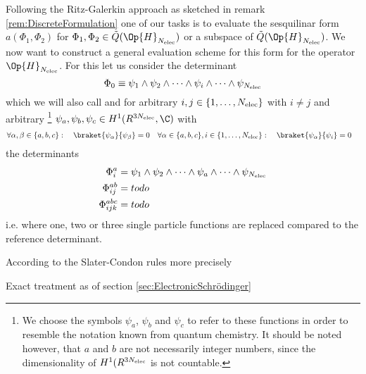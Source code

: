 Following the Ritz-Galerkin approach
as sketched in remark \vref{rem:DiscreteFormulation}
one of our tasks is to evaluate the sesquilinar form
$a(\Phi_1, \Phi_2)$ for $\Phi_1, \Phi_2 \in \tilde{Q}(\Op{H}_{\Nelec})$ or a subspace of $\tilde{Q}(\Op{H}_{\Nelec})$.
We now want to construct a general evaluation scheme
for this form for the operator $\Op{H}_{\Nelec}$.
For this let us consider the determinant
\[
	\Phi_0 \equiv \psi_1 \wedge \psi_2 \wedge \cdots \wedge \psi_i \wedge \cdots \wedge \psi_{N_\text{elec}}
\]
which we will also call 
and for arbitrary $i,j \in \{1,\ldots,N_\text{elec}\}$
with $i \neq j$
and arbitrary%
\footnote{We choose the symbols $\psi_a$, $\psi_b$ and $\psi_c$ to refer to these functions in order to resemble the notation known from quantum chemistry. It should be noted however, that $a$ and $b$ are not necessarily integer numbers, since the dimensionality of $H^1(R^{3N_\text{elec}}$ is not countable.}
$\psi_a, \psi_b, \psi_c \in H^1(R^{3\Nelec}, \C)$
with
\begin{align*}
	\forall \alpha,\beta \in \{a,b,c\}: \quad
	\braket{\psi_\alpha}{\psi_\beta} &= 0
	&
	\forall \alpha \in \{a,b,c\}, i \in \{1,\ldots,\Nelec\}: \quad
	\braket{\psi_\alpha}{\psi_i} &= 0
\end{align*}
the determinants
\begin{align*}
	\Phi_i^a &= \psi_1 \wedge \psi_2 \wedge \cdots \wedge \psi_a \wedge \cdots \wedge \psi_{N_\text{elec}} \\
	\Phi_{ij}^{ab} &= todo \\
	\Phi_{ijk}^{abc} &= todo
\end{align*}
i.e. where one, two or three single particle functions are replaced
compared to the reference determinant.

According to the Slater-Condon rules
more precisely



Exact treatment as of section \vref{sec:ElectronicSchrödinger}




